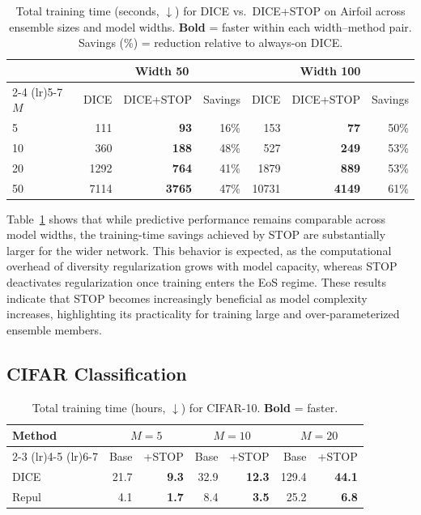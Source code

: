 \documentclass[sigconf]{acmart}
\begin{document}
\begin{table}[ht]
\centering
\caption{Total training time (seconds, $\downarrow$) for DICE vs.\ DICE+STOP on Airfoil across ensemble sizes and model widths. \textbf{Bold} = faster within each width--method pair. Savings (\%) = reduction relative to always-on DICE.}
\label{tab:uci_width_time}
\small
\begin{tabular}{lrrrrrr}
\toprule
 & \multicolumn{3}{c}{Width 50} & \multicolumn{3}{c}{Width 100} \\
\cmidrule(lr){2-4} \cmidrule(lr){5-7}
$M$ & DICE & DICE+STOP & Savings & DICE & DICE+STOP & Savings \\
\midrule
5  & 111 & \textbf{93}   & 16\% & 153   & \textbf{77}   & 50\% \\
10 & 360 & \textbf{188}  & 48\% & 527   & \textbf{249}  & 53\% \\
20 & 1292 & \textbf{764} & 41\% & 1879  & \textbf{889}  & 53\% \\
50 & 7114 & \textbf{3765} & 47\% & 10731 & \textbf{4149} & 61\% \\
\bottomrule
\end{tabular}
\end{table}

Table~\ref{tab:uci_width_time} shows that while predictive performance remains comparable across model widths, the training-time savings achieved by STOP are substantially larger for the wider network. This behavior is expected, as the computational overhead of diversity regularization grows with model capacity, whereas STOP deactivates regularization once training enters the EoS regime. These results indicate that STOP becomes increasingly beneficial as model complexity increases, highlighting its practicality for training large and over-parameterized ensemble members.





\subsection{CIFAR Classification}
\label{subsec:cifar}

\begin{table}[!t]
\centering
\caption{Total training time (hours, $\downarrow$) for CIFAR-10. \textbf{Bold} = faster.}
\label{tab:cifar_training_time}
\small
\begin{tabular}{lrrrrrr}
\toprule
Method & \multicolumn{2}{c}{$M=5$} & \multicolumn{2}{c}{$M=10$} & \multicolumn{2}{c}{$M=20$} \\
\cmidrule(lr){2-3} \cmidrule(lr){4-5} \cmidrule(lr){6-7}
 & Base & +STOP & Base & +STOP & Base & +STOP \\
\midrule
DICE  & 21.7 & \textbf{9.3} & 32.9 & \textbf{12.3} & 129.4 & \textbf{44.1} \\
Repul & 4.1  & \textbf{1.7} & 8.4  & \textbf{3.5}  & 25.2  & \textbf{6.8}  \\
\bottomrule
\end{tabular}
\end{table}
\end{document}
